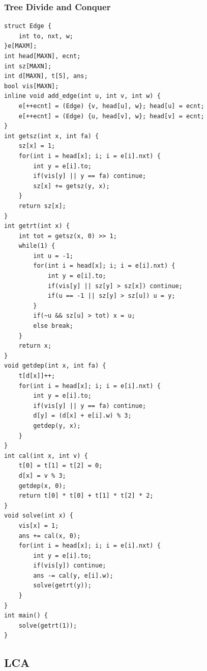 \documentclass[10pt]{ctexart}
\begin{document}
{\subsubsection{Tree Divide and Conquer}
\begin{lstlisting}
struct Edge {
    int to, nxt, w;
}e[MAXM];
int head[MAXN], ecnt;
int sz[MAXN];
int d[MAXN], t[5], ans;
bool vis[MAXN];
inline void add_edge(int u, int v, int w) {
    e[++ecnt] = (Edge) {v, head[u], w}; head[u] = ecnt;
    e[++ecnt] = (Edge) {u, head[v], w}; head[v] = ecnt;
}
int getsz(int x, int fa) {
    sz[x] = 1;
    for(int i = head[x]; i; i = e[i].nxt) {
        int y = e[i].to;
        if(vis[y] || y == fa) continue;
        sz[x] += getsz(y, x);
    }
    return sz[x];
}
int getrt(int x) {
    int tot = getsz(x, 0) >> 1;
    while(1) {
        int u = -1;
        for(int i = head[x]; i; i = e[i].nxt) {
            int y = e[i].to;
            if(vis[y] || sz[y] > sz[x]) continue;
            if(u == -1 || sz[y] > sz[u]) u = y;
        }
        if(~u && sz[u] > tot) x = u;
        else break;
    }
    return x;
}
void getdep(int x, int fa) {
    t[d[x]]++;
    for(int i = head[x]; i; i = e[i].nxt) {
        int y = e[i].to;
        if(vis[y] || y == fa) continue;
        d[y] = (d[x] + e[i].w) % 3;
        getdep(y, x);
    }
}
int cal(int x, int v) {
    t[0] = t[1] = t[2] = 0;
    d[x] = v % 3;
    getdep(x, 0);
    return t[0] * t[0] + t[1] * t[2] * 2;
}
void solve(int x) {
    vis[x] = 1;
    ans += cal(x, 0);
    for(int i = head[x]; i; i = e[i].nxt) {
        int y = e[i].to;
        if(vis[y]) continue;
        ans -= cal(y, e[i].w);
        solve(getrt(y));
    }
}
int main() {
    solve(getrt(1));
}
\end{lstlisting}
\subsection{LCA}
}
\end{document}
